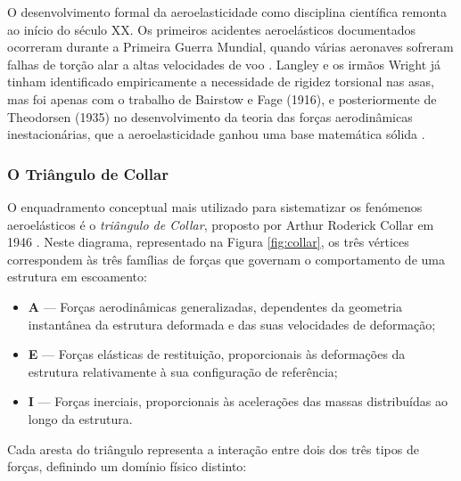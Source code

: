 \documentclass[a4paper,fleqn]{cas-sc}
\begin{document}
O desenvolvimento formal da aeroelasticidade como disciplina científica remonta ao início do século XX. Os primeiros acidentes aeroelásticos documentados ocorreram durante a Primeira Guerra Mundial, quando várias aeronaves sofreram falhas de torção alar a altas velocidades de voo \cite{Collar1946}. Langley e os irmãos Wright já tinham identificado empiricamente a necessidade de rigidez torsional nas asas, mas foi apenas com o trabalho de Bairstow e Fage (1916), e posteriormente de Theodorsen (1935) no desenvolvimento da teoria das forças aerodinâmicas inestacionárias, que a aeroelasticidade ganhou uma base matemática sólida \cite{Fung1993, Theodorsen1935}.

\subsubsection{O Triângulo de Collar}

O enquadramento conceptual mais utilizado para sistematizar os fenómenos aeroelásticos é o \textit{triângulo de Collar}, proposto por Arthur Roderick Collar em 1946 \cite{Collar1946}. Neste diagrama, representado na Figura \ref{fig:collar}, os três vértices correspondem às três famílias de forças que governam o comportamento de uma estrutura em escoamento:

\begin{itemize}
    \item \textbf{A} --- Forças aerodinâmicas generalizadas, dependentes da geometria instantânea da estrutura deformada e das suas velocidades de deformação;
    \item \textbf{E} --- Forças elásticas de restituição, proporcionais às deformações da estrutura relativamente à sua configuração de referência;
    \item \textbf{I} --- Forças inerciais, proporcionais às acelerações das massas distribuídas ao longo da estrutura.
\end{itemize}

Cada aresta do triângulo representa a interação entre dois dos três tipos de forças, definindo um domínio físico distinto:
\end{document}
